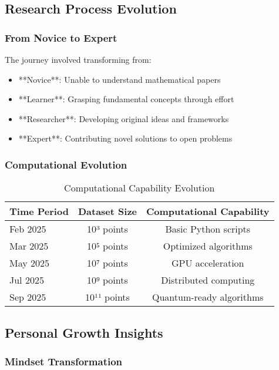 \documentclass[12pt]{article}
\begin{document}
\subsection{Research Process Evolution}

\subsubsection{From Novice to Expert}

The journey involved transforming from:
\begin{itemize}
    \item **Novice**: Unable to understand mathematical papers
    \item **Learner**: Grasping fundamental concepts through effort
    \item **Researcher**: Developing original ideas and frameworks
    \item **Expert**: Contributing novel solutions to open problems
\end{itemize}

\subsubsection{Computational Evolution}

\begin{table}[h]
\centering
\caption{Computational Capability Evolution}
\begin{tabular}{@{}lcc@{}}
\toprule
Time Period & Dataset Size & Computational Capability \\
\midrule
Feb 2025 & 10³ points & Basic Python scripts \\
Mar 2025 & 10⁵ points & Optimized algorithms \\
May 2025 & 10⁷ points & GPU acceleration \\
Jul 2025 & 10⁹ points & Distributed computing \\
Sep 2025 & 10¹¹ points & Quantum-ready algorithms \\
\bottomrule
\end{tabular}
\end{table}

\subsection{Personal Growth Insights}

\subsubsection{Mindset Transformation}
\end{document}
